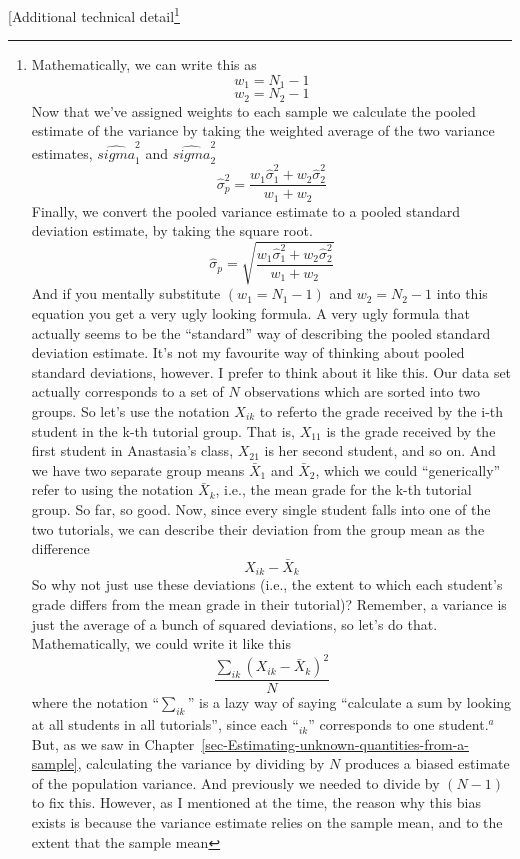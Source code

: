 \documentclass[
  a4paper,
]{book}
\begin{document}
{[}Additional technical detail\footnote{Mathematically, we can write
  this as \[w_1=N_1-1\] \[w_2=N_2-1\] Now that we've assigned weights to
  each sample we calculate the pooled estimate of the variance by taking
  the weighted average of the two variance estimates,
  \(\hat{sigma}_{1}^{2}\) and \(\hat{sigma}_{2}^{2}\)
  \[\hat{\sigma}_p^2=\frac{w_1\hat{\sigma}_1^2+w_2\hat{\sigma}_2^2}{w_1+w_2}\]
  Finally, we convert the pooled variance estimate to a pooled standard
  deviation estimate, by taking the square root.
  \[\hat{\sigma}_p=\sqrt{\frac{w_1\hat{\sigma}_1^2+w_2\hat{\sigma}_2^2}{w_1+w_2}}\]
  And if you mentally substitute \((w_1 = N_1 - 1)\) and
  \(w_2 = N_2 - 1\) into this equation you get a very ugly looking
  formula. A very ugly formula that actually seems to be the
  ``standard'' way of describing the pooled standard deviation estimate.
  It's not my favourite way of thinking about pooled standard
  deviations, however. I prefer to think about it like this. Our data
  set actually corresponds to a set of \(N\) observations which are
  sorted into two groups. So let's use the notation \(X_{ik}\) to
  referto the grade received by the i-th student in the k-th tutorial
  group. That is, \(X_{11}\) is the grade received by the first student
  in Anastasia's class, \(X_{21}\) is her second student, and so on. And
  we have two separate group means \(\bar{X}_1\) and \(\bar{X}_2\),
  which we could ``generically'' refer to using the notation
  \(\bar{X}_k\), i.e., the mean grade for the k-th tutorial group. So
  far, so good. Now, since every single student falls into one of the
  two tutorials, we can describe their deviation from the group mean as
  the difference \[X_{ik}-\bar{X}_k\] So why not just use these
  deviations (i.e., the extent to which each student's grade differs
  from the mean grade in their tutorial)? Remember, a variance is just
  the average of a bunch of squared deviations, so let's do that.
  Mathematically, we could write it like this
  \[\frac{\sum_{ik}(X_{ik}-\bar{X}_k)^2}{N}\] where the notation
  ``\(\sum_{ik}\)'' is a lazy way of saying ``calculate a sum by looking
  at all students in all tutorials'', since each ``\(_{ik}\)''
  corresponds to one student.\(^a\) But, as we saw in
  Chapter~\ref{sec-Estimating-unknown-quantities-from-a-sample},
  calculating the variance by dividing by \(N\) produces a biased
  estimate of the population variance. And previously we needed to
  divide by \((N - 1)\) to fix this. However, as I mentioned at the
  time, the reason why this bias exists is because the variance estimate
  relies on the sample mean, and to the extent that the sample mean
}
\end{document}
